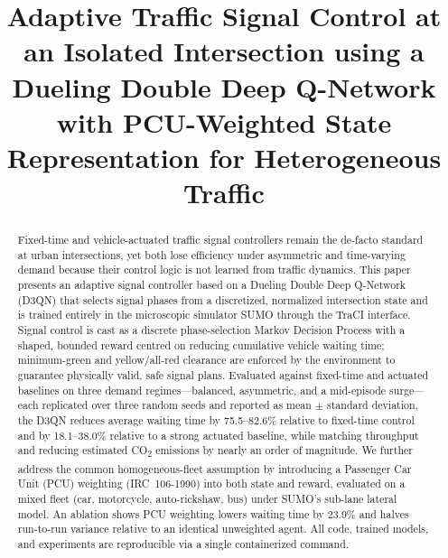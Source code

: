\documentclass[conference]{IEEEtran}
\begin{document}
\title{Adaptive Traffic Signal Control at an Isolated Intersection using a
Dueling Double Deep Q-Network with PCU-Weighted State Representation for
Heterogeneous Traffic}

\author{
}

\maketitle

\begin{abstract}
Fixed-time and vehicle-actuated traffic signal controllers remain the de-facto
standard at urban intersections, yet both lose efficiency under asymmetric and
time-varying demand because their control logic is not learned from traffic
dynamics. This paper presents an adaptive signal controller based on a
Dueling Double Deep Q-Network (D3QN) that selects signal phases from a
discretized, normalized intersection state and is trained entirely in the
microscopic simulator SUMO through the TraCI interface. Signal control is cast
as a discrete phase-selection Markov Decision Process with a shaped, bounded
reward centred on reducing cumulative vehicle waiting time; minimum-green and
yellow/all-red clearance are enforced by the environment to guarantee physically
valid, safe signal plans. Evaluated against fixed-time and actuated baselines on
three demand regimes---balanced, asymmetric, and a mid-episode surge---each
replicated over three random seeds and reported as mean $\pm$ standard deviation,
the D3QN reduces average waiting time by 75.5--82.6\% relative to fixed-time
control and by 18.1--38.0\% relative to a strong actuated baseline, while
matching throughput and reducing estimated CO\textsubscript{2} emissions by
nearly an order of magnitude. We further address the common homogeneous-fleet
assumption by introducing a Passenger Car Unit (PCU) weighting (IRC~106-1990)
into both state and reward, evaluated on a mixed fleet (car, motorcycle,
auto-rickshaw, bus) under SUMO's sub-lane lateral model. An ablation shows PCU
weighting lowers waiting time by 23.9\% and halves run-to-run variance relative
to an identical unweighted agent. All code, trained models, and experiments are
reproducible via a single containerized command.
\end{abstract}
\end{document}
